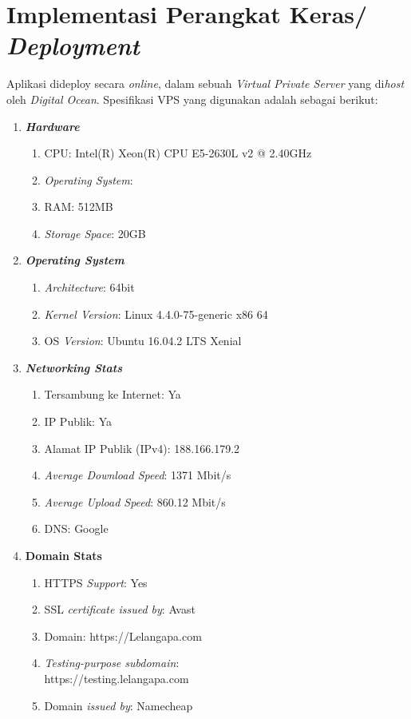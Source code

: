   \section{Implementasi Perangkat Keras/ \textit{Deployment}}
  
  Aplikasi dideploy secara \textit{online}, dalam sebuah \textit{Virtual Private Server} yang di\textit{host} oleh \textit{Digital Ocean}.
  Spesifikasi VPS yang digunakan adalah sebagai berikut:
  
  \begin{enumerate}
  	\item \textbf{\textit{Hardware}}
  	\begin{enumerate}
  		\item CPU: Intel(R) Xeon(R) CPU E5-2630L v2 @ 2.40GHz
  		\item \textit{Operating System}: 
  		\item RAM: 512MB
  		\item \textit{Storage Space}: 20GB
  	\end{enumerate}
  	
  	\item \textbf{\textit{Operating System}}
  	\begin{enumerate}
  		\item \textit{Architecture}: 64bit
  		\item \textit{Kernel Version}: Linux 4.4.0-75-generic x86 64
  		\item OS \textit{Version}: Ubuntu 16.04.2 LTS Xenial
  	\end{enumerate}
  	
  	\item \textit{\textbf{Networking Stats}}
  	\begin{enumerate}
  		\item Tersambung ke Internet: Ya
  		\item IP Publik: Ya
  		\item Alamat IP Publik (IPv4): 188.166.179.2
  		\item \textit{Average Download Speed}: 1371 Mbit/s
  		\item \textit{Average Upload Speed}: 860.12 Mbit/s
  		\item DNS: Google
  	\end{enumerate}
  	
  	\item \textbf{\textbf{Domain Stats}}
  	\begin{enumerate}
  		\item HTTPS \textit{Support}: Yes
  		\item SSL \textit{certificate issued by}: Avast
  		\item Domain: https://Lelangapa.com
  		\item \textit{Testing-purpose subdomain}: \\https://testing.lelangapa.com
  		\item Domain \textit{issued by}: Namecheap
  	\end{enumerate}
  	
  \end{enumerate}
  
